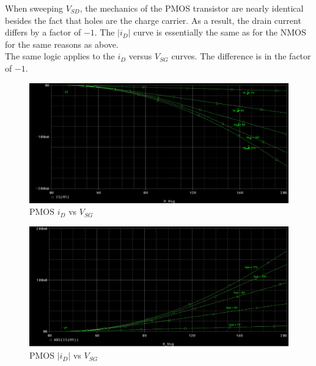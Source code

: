 \FloatBarrier


When sweeping $V_{SD}$, the mechanics of the PMOS transistor are nearly identical besides the fact that holes are the charge carrier. As a result, the drain current differs by a factor of $-1$. The $|i_D|$ curve is essentially the same as for the NMOS for the same reasons as above. \\

The same logic applies to the $i_{D}$ versus $V_{SG}$ curves. The difference is in the factor of $-1$.

\FloatBarrier

\begin{figure}[h!]
	\centering
	\includegraphics[scale=0.25]{./images/id_vs_vsg.PNG}
	\caption{PMOS $i_D$ vs $V_{SG}$}
	\label{fig:id_vs_vsg}
\end{figure}

\FloatBarrier

\FloatBarrier

\begin{figure}[h!]
	\centering
	\includegraphics[scale=0.5]{./images/id_vs_vsg_abs.PNG}
	\caption{PMOS $|i_D|$ vs $V_{SG}$}
	\label{fig:id_vs_vsg_abs}
\end{figure}

\FloatBarrier
